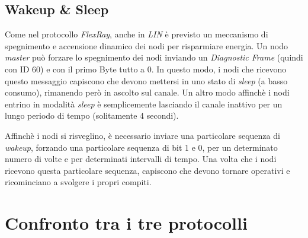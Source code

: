 \subsection{Wakeup \& Sleep}
Come nel protocollo \emph{FlexRay}, anche in \emph{LIN} è previsto un meccanismo di spegnimento e accensione dinamico dei nodi per risparmiare energia. Un nodo \emph{master} può forzare lo spegnimento dei nodi inviando un \emph{Diagnostic Frame} (quindi con ID 60) e con il primo Byte tutto a 0. In questo modo, i nodi che ricevono questo messaggio capiscono che devono mettersi in uno stato di \emph{sleep} (a basso consumo), rimanendo però in ascolto sul canale. Un altro modo affinchè i nodi entrino in modalità \emph{sleep} è semplicemente lasciando il canale inattivo per un lungo periodo di tempo (solitamente 4 secondi).

Affinchè i nodi si risveglino, è necessario inviare una particolare sequenza di \emph{wakeup}, forzando una particolare sequenza di bit 1 e 0, per un determinato numero di volte e per determinati intervalli di tempo. Una volta che i nodi ricevono questa particolare sequenza, capiscono che devono tornare operativi e ricominciano a svolgere i propri compiti.

\section{Confronto tra i tre protocolli}

\newpage
